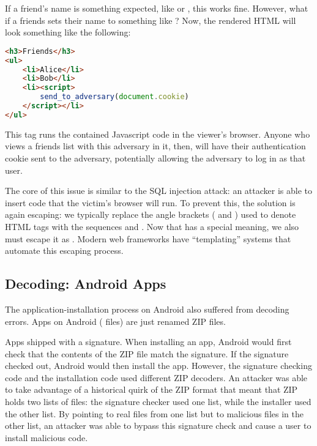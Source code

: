 If a friend's name is something expected, like  or , this works fine. However, what if a friends sets their name to something like ? Now, the rendered HTML will look something like the following:

\begin{lstlisting}[language=html]
<h3>Friends</h3>	
<ul>
	<li>Alice</li>
	<li>Bob</li>
	<li><script>
		send_to_adversary(document.cookie)
	</script></li>
</ul>
\end{lstlisting}

This  tag runs the contained Javascript code in the viewer's browser. Anyone who views a friends list with this adversary in it, then, will have their authentication cookie sent to the adversary, potentially allowing the adversary to log in as that user.

The core of this issue is similar to the SQL injection attack: an attacker is
able to insert code that the victim's browser will run. To prevent this, the solution is again
escaping: we typically replace the angle brackets (\ttt{<} and \ttt{>}) used to denote HTML tags 
with the sequences  and . Now
that \ttt{&} has a special meaning, we also must escape it as .
Modern web frameworks have ``templating'' systems that automate this escaping process.


\subsection{Decoding: Android Apps}
The application-installation process on Android also suffered from decoding errors. Apps on Android ( files) are just renamed ZIP files.

Apps shipped with a signature. When installing an app, Android would first check that the contents of the ZIP file match the signature. If the signature checked out, Android would then install the app. However, the signature checking code and the installation code used different ZIP decoders. An attacker was able to take advantage of a historical quirk of the ZIP format that meant that ZIP holds two lists of files: the signature checker used one list, while the installer used the other list. By pointing to real files from one list but to malicious files in the other list, an attacker was able to bypass this signature check and cause a user to install malicious code.

